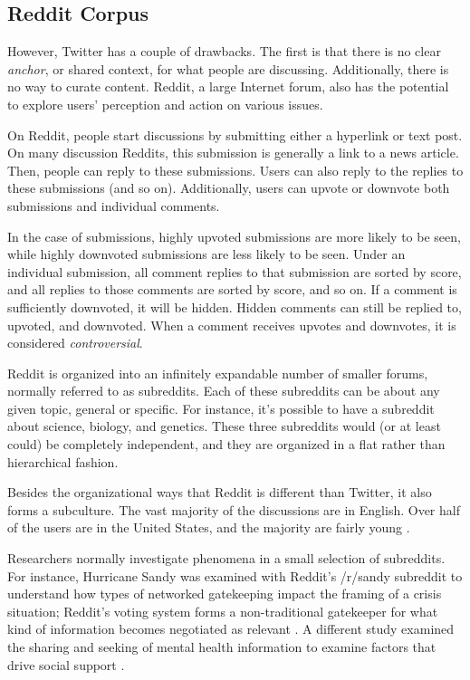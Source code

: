 \subsection{Reddit Corpus}
However, Twitter has a couple of drawbacks. The first is that there is no clear \textit{anchor}, or shared context, for what people are discussing. Additionally, there is no way to curate content. Reddit, a large Internet forum, also has the potential to explore users' perception and action on various issues. 

On Reddit, people start discussions by submitting either a hyperlink or text post. On many discussion Reddits, this submission is generally a link to a news article. Then, people can reply to these submissions. Users can also reply to the replies to these submissions (and so on). Additionally, users can upvote or downvote both submissions and individual comments. 

In the case of submissions, highly upvoted submissions are more likely to be seen, while highly downvoted submissions are less likely to be seen. Under an individual submission, all comment replies to that submission are sorted by score, and all replies to those comments are sorted by score, and so on. If a comment is sufficiently downvoted, it will be hidden. Hidden comments can still be replied to, upvoted, and downvoted. When a comment receives upvotes and downvotes, it is considered \textit{controversial}.  

Reddit is organized into an infinitely expandable number of smaller forums, normally referred to as subreddits. Each of these subreddits can be about any given topic, general or specific. For instance, it's possible to have a subreddit about science, biology, and genetics. These three subreddits would (or at least could) be completely independent, and they are organized in a flat rather than hierarchical fashion.

Besides the organizational ways that Reddit is different than Twitter, it also forms a subculture. The vast majority of the discussions are in English. Over half of the users are in the United States, and the majority are fairly young \cite{pewinternet}. 

Researchers normally investigate phenomena in a small selection of subreddits. For instance, Hurricane Sandy was examined with Reddit's /r/sandy subreddit to understand how types of networked gatekeeping impact the framing of a crisis situation; Reddit's voting system forms a non-traditional gatekeeper for what kind of information becomes negotiated as relevant \cite{Leavitt}. A different study examined the sharing and seeking of mental health information to examine factors that drive social support \cite{dechoudhury2014mental}.

